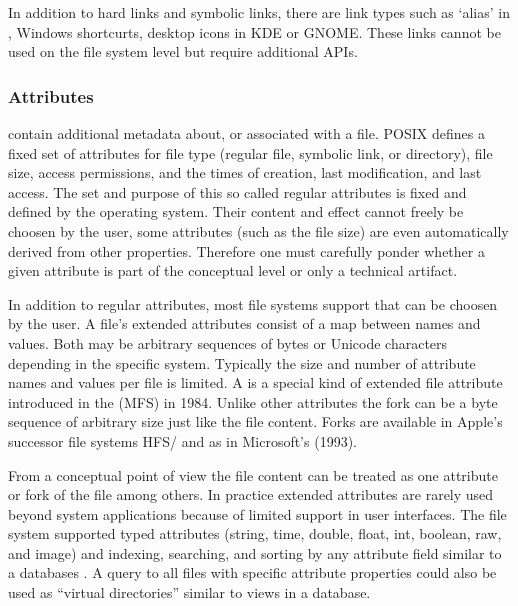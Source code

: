 In addition to hard links and symbolic links, there are link types such as
`alias' in , Windows shortcurts, desktop icons in KDE or GNOME.
These links cannot be used on the file system level but require additional
APIs. 


\subsubsection{Attributes}

 contain additional metadata about, or associated with a 
file. POSIX defines a fixed set of attributes for file type (regular file, symbolic
link, or directory), file size, access permissions, and the times of creation,
last modification, and last access. The set and purpose of this so called regular
attributes is fixed and defined by the operating system. Their content and
effect cannot freely be choosen by the user, some attributes (such as the file
size) are even automatically derived from other properties. Therefore one must
carefully ponder whether a given attribute is part of the conceptual level or
only a technical artifact.

In addition to regular attributes, most file systems support  that can be choosen by the user. A
file's extended attributes consist of a map between names and values. Both may
be arbitrary sequences of bytes or Unicode characters depending in the specific
system.  Typically the size and number of attribute names and values per file
is limited. A  is a special kind of extended file attribute
introduced in the  (MFS) in 1984. Unlike other
attributes the fork can be a byte sequence of arbitrary size just like the file
content. Forks are available in Apple's successor file systems HFS/
and as  in Microsoft's  (1993).

From a conceptual point of view the file content can be treated as one attribute
or fork of the file among others. In practice extended attributes are rarely
used beyond system applications because of limited support in user
interfaces. The  file system supported typed attributes (string,
time, double, float, int, boolean, raw, and image) and indexing, searching, and
sorting by any attribute field similar to a databases \cite{Giampaolo1999}. A
query to all files with specific attribute properties could also be used as
``virtual directories'' similar to views in a database.


